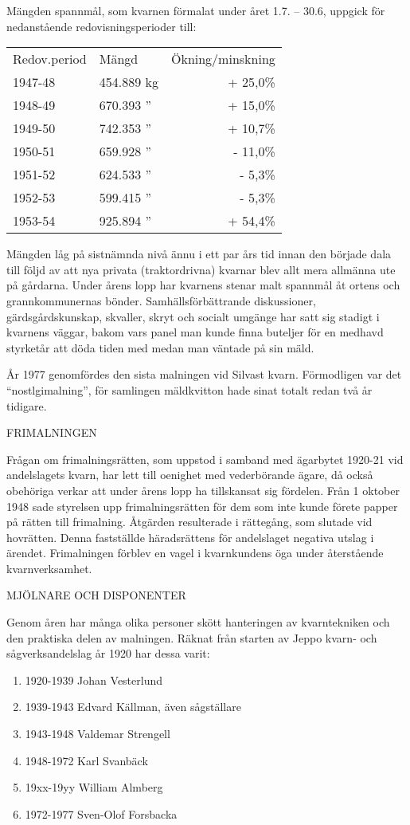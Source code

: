Mängden spannmål, som kvarnen förmalat under året 1.7. – 30.6, uppgick för nedanstående redovisningsperioder till:
\begin{center}
  \begin{tabular}{l l r}
    \hline
    Redov.period & Mängd & Ökning/minskning \\
    1947-48	&	454.889 kg & + 25,0\% \\
    1948-49	&	670.393 '' & + 15,0\% \\
    1949-50	&	742.353 '' & + 10,7\% \\
    1950-51	&	659.928 '' & - 11,0\% \\
    1951-52	&	624.533 '' & -  5,3\% \\
    1952-53	&	599.415 '' & -  5,3\% \\
    1953-54	&	925.894 '' & + 54,4\% \\
    \hline
  \end{tabular}
\end{center}

Mängden låg på sistnämnda nivå ännu i ett par års tid innan den började dala till följd av att nya privata (traktordrivna) kvarnar blev allt mera allmänna ute på gårdarna. Under årens lopp har kvarnens stenar malt spannmål åt ortens och grannkommunernas bönder. Samhällsförbättrande diskussioner, gärdsgårdskunskap, skvaller, skryt och socialt umgänge har satt sig stadigt i kvarnens väggar, bakom vars panel man kunde finna buteljer för en medhavd styrketår att döda tiden med medan man väntade på sin mäld.

År 1977 genomfördes den sista malningen vid Silvast kvarn. Förmodligen var det ``nostlgimalning'', för samlingen mäldkvitton hade sinat totalt redan två år tidigare.


FRIMALNINGEN

Frågan om frimalningsrätten, som uppstod i samband med ägarbytet 1920-21 vid andelslagets kvarn, har lett till oenighet med vederbörande ägare, då också obehöriga verkar att under årens lopp ha tillskansat sig fördelen. Från 1 oktober 1948 sade styrelsen upp frimalningsrätten för dem som inte kunde förete papper på rätten till frimalning. Åtgärden resulterade i rättegång, som slutade vid hovrätten. Denna fastställde häradsrättens för andelslaget negativa utslag i ärendet. Frimalningen förblev en vagel i kvarnkundens öga under återstående kvarnverksamhet.


MJÖLNARE OCH DISPONENTER

Genom åren har många olika personer skött hanteringen av kvarntekniken och den praktiska delen av malningen. Räknat från starten av Jeppo kvarn- och sågverksandelslag år 1920 har dessa varit:
\begin{enumerate}
  \item 1920-1939		Johan Vesterlund
  \item 1939-1943		Edvard Källman, även sågställare
  \item 1943-1948		Valdemar Strengell
  \item 1948-1972		Karl Svanbäck
  \item 19xx-19yy   William Almberg
  \item 1972-1977		Sven-Olof Forsbacka
\end{enumerate}

